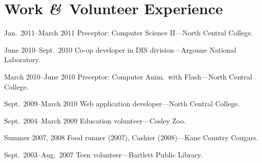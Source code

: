 \documentclass[11pt]{simplecv}
\newcommand*\amp{{\fertigopro\itshape\&}}
\newcommand*\nbds[1][-]{\nobreakdashes#1\hspace{0pt}}
\begin{document}
  \section{Work \amp\ Volunteer Experience}
  \begin{topic}
    \item[Jan.\ 2011--March 2011] Preceptor: Computer Science II---North Central College.
    \item[June 2010--Sept.\ 2010] Co\nbds op developer in DIS division---Argonne National Laboratory.
    \item[March 2010--June 2010] Preceptor: Computer Anim.\ with Flash---North Central College.
    \item[Sept.\ 2009--March 2010] Web application developer---North Central College.
    \item[Sept.\ 2004--March 2009] Education volunteer---Cosley Zoo.
    \item[Summer 2007, 2008] Food runner (2007), Cashier (2008)---Kane Country Cougars.
    \item[Sept.\ 2003--Aug.\ 2007] Teen volunteer---Bartlett Public Library.
  \end{topic}
\end{document}
